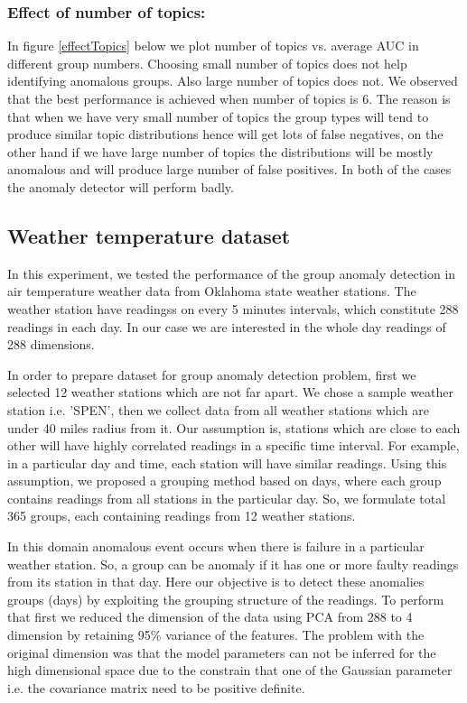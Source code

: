 \documentclass[letterpaper]{article}
\begin{document}
\subsubsection{Effect of number of topics:} In figure \ref{effectTopics} below we plot number of topics vs. average AUC in different group numbers. Choosing small number of topics does not help identifying anomalous groups. Also large number of topics does not. We observed that the best performance is achieved when number of topics is 6. The reason is that when we have very small number of topics the group types will tend to produce similar topic distributions hence will get lots of false negatives, on the other hand if we have large number of topics the distributions will be mostly anomalous and will produce large number of false positives. In both of the cases the anomaly detector will perform badly.

\subsection{Weather temperature dataset}
In this experiment, we tested the performance of the group anomaly detection in air temperature weather data from Oklahoma state weather stations. The weather station have readingss on every 5 minutes intervals, which constitute 288 readings in each day. In our case we are interested in the whole day readings of 288 dimensions.

In order to prepare dataset for group anomaly detection problem, first we selected 12 weather stations which are not far apart. We chose a sample weather station i.e. 'SPEN', then we collect data from all weather stations which are under 40 miles radius from it. Our assumption is, stations which are close to each other will have highly correlated readings in a specific time interval. For example, in a particular day and time, each station will have similar readings. Using this assumption, we proposed a grouping method based on days, where each group contains readings from all stations in the particular day. So, we formulate total 365 groups, each containing readings from 12 weather stations.

In this domain anomalous event occurs when there is failure in a particular weather station. So, a group can be anomaly if it has one or more faulty readings from its station in that day. Here our objective is to detect these anomalies groups (days) by exploiting the grouping structure of the readings. To perform that first we reduced the dimension of the data using PCA from 288 to 4 dimension by retaining 95\% variance of the features. The problem with the original dimension was that the model parameters can not be inferred for the high dimensional space due to the constrain that one of the Gaussian parameter i.e. the covariance matrix need to be positive definite.
\end{document}
